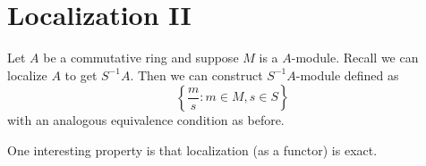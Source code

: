 \section{Localization II}
Let $A$ be a commutative ring and suppose $M$ is a $A$-module. Recall we can localize $A$ to get $S^{-1}A$. Then we can construct $S^{-1}A$-module defined as
\[
    \left\{ \frac{m}{s} : m \in M, s \in S\right\}
\]
with an analogous equivalence condition as before.

One interesting property is that localization (as a functor) is exact.
